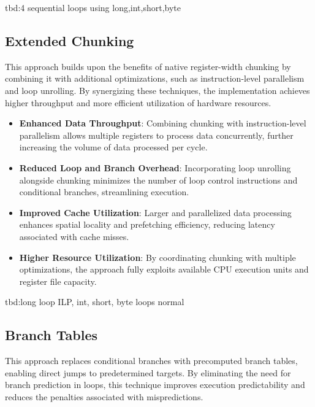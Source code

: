 \documentclass{article}
\begin{document}
tbd:4 sequential loops using long,int,short,byte

\subsection{Extended Chunking}

This approach builds upon the benefits of native register-width chunking by combining it with additional optimizations, such as instruction-level parallelism and loop unrolling. By synergizing these techniques, the implementation achieves higher throughput and more efficient utilization of hardware resources.

\begin{itemize}
  \item \textbf{Enhanced Data Throughput}: Combining chunking with instruction-level parallelism allows multiple registers to process data concurrently, further increasing the volume of data processed per cycle.
  \item \textbf{Reduced Loop and Branch Overhead}: Incorporating loop unrolling alongside chunking minimizes the number of loop control instructions and conditional branches, streamlining execution.
  \item \textbf{Improved Cache Utilization}: Larger and parallelized data processing enhances spatial locality and prefetching efficiency, reducing latency associated with cache misses.
  \item \textbf{Higher Resource Utilization}: By coordinating chunking with multiple optimizations, the approach fully exploits available CPU execution units and register file capacity.
\end{itemize}

tbd:long loop ILP, int, short, byte loops normal

\subsection{Branch Tables}

This approach replaces conditional branches with precomputed branch tables, enabling direct jumps to predetermined targets. By eliminating the need for branch prediction in loops, this technique improves execution predictability and reduces the penalties associated with mispredictions.
\end{document}
